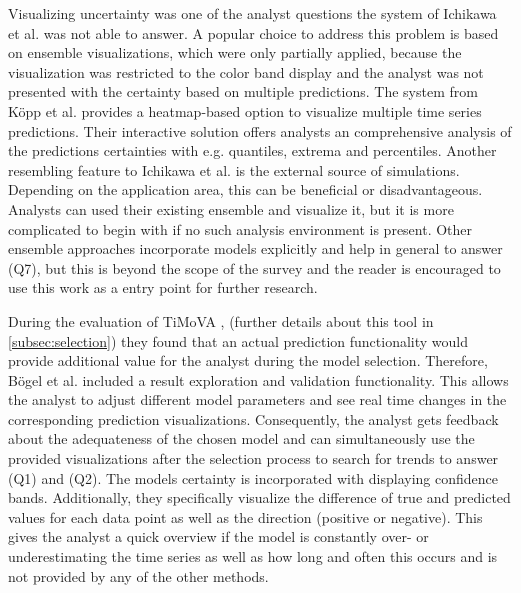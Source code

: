 \documentclass[electronic]{vgtc}             %
\begin{document}
Visualizing uncertainty was one of the analyst questions the system of Ichikawa et al. \cite{ichikawa:2002} was not able to answer.
A popular choice to address this problem is based on ensemble visualizations, which were only partially applied, because the visualization was restricted to the color band display and the analyst was not presented with the certainty based on multiple predictions. 
The system from K\"opp et al. \cite{koepp:2014} provides a heatmap-based option to visualize multiple time series predictions. 
Their interactive solution offers analysts an comprehensive analysis of the predictions certainties with e.g. quantiles, extrema and percentiles. 
Another resembling feature to Ichikawa et al. \cite{ichikawa:2002} is the external source of simulations. 
Depending on the application area, this can be beneficial or disadvantageous. 
Analysts can used their existing ensemble and visualize it, but it is more complicated to begin with if no such analysis environment is present. 
Other ensemble approaches incorporate models explicitly and help in general to answer (Q7), but this is beyond the scope of the survey and the reader is encouraged to use this work as a entry point for further research. 

During the evaluation of TiMoVA \cite{boegl:2013}, (further details about this tool in \autoref{subsec:selection}) they found that an actual prediction functionality would provide additional value for the analyst during the model selection.
Therefore, B\"ogel et al. \cite{boegl:2014} included a result exploration and validation functionality.
This allows the analyst to adjust different model parameters and see real time changes in the corresponding prediction visualizations.
Consequently, the analyst gets feedback about the adequateness of the chosen model and can simultaneously use the provided visualizations after the selection process to search for trends to answer (Q1) and (Q2).
The models certainty is incorporated with displaying confidence bands.
Additionally, they specifically visualize the difference of true and predicted values for each data point as well as the direction (positive or negative).
This gives the analyst a quick overview if the model is constantly over- or underestimating the time series as well as how long and often this occurs and is not provided by any of the other methods.
\end{document}
